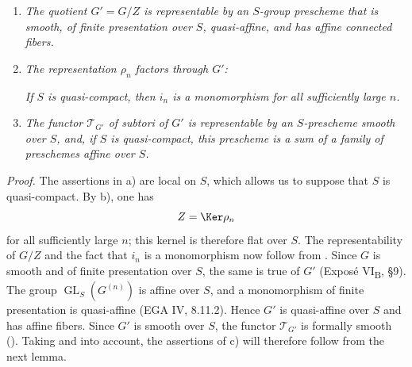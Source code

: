 \begin{enumerate}
\renewcommand{\labelenumi}{\textit{\alph{enumi})}}
\item \textit{The quotient \(G'=G/Z\) is representable by an
\(S\)-group prescheme that is smooth, of finite presentation over
\(S\), quasi-affine, and has affine connected fibers.}

\item \textit{The representation \(\rho_n\) factors through \(G'\):}
\begin{center}


\end{center}
\textit{If \(S\) is quasi-compact, then \(i_n\) is a monomorphism
for all sufficiently large \(n\).}

\item \textit{The functor \(\mathscr T_{G'}\) of subtori of \(G'\)
is representable by an \(S\)-prescheme smooth over \(S\), and, if
\(S\) is quasi-compact, this prescheme is a sum of a family of
preschemes affine over \(S\).}
\end{enumerate}

\medskip
\noindent\textit{Proof.}
The assertions in a) are local on \(S\), which allows us to suppose
that \(S\) is quasi-compact. By  b), one has
\[
  Z=\Ker\rho_n
\]
for all sufficiently large \(n\); this kernel is therefore flat
over \(S\). The representability of \(G/Z\) and the fact that \(i_n\)
is a monomorphism now follow from . Since \(G\) is smooth and of
finite presentation over \(S\), the same is true of \(G'\)
(Exposé VI\textsubscript{B}, \S9). The group
\(\operatorname{GL}_S(G^{(n)})\) is affine over \(S\), and a
monomorphism of finite presentation is quasi-affine
(EGA IV, 8.11.2). Hence \(G'\) is quasi-affine over \(S\) and has
affine fibers. Since \(G'\) is smooth over \(S\), the functor
\(\mathscr T_{G'}\) is formally smooth ().
Taking  and  into account, the assertions of  c)
will therefore follow from the next lemma.

